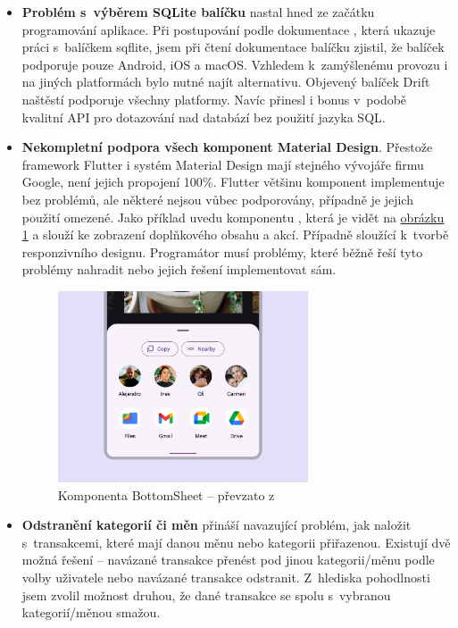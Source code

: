 \documentclass[
  biblatex,
  figures=true,
  tables=false,
  glossaries,
  index
]{kidiplom}
\begin{document}
\begin{itemize}
  \item \textbf{Problém s~výběrem SQLite balíčku} nastal hned ze začátku programování aplikace. Při postupování podle dokumentace \cite{flutter-docs}, která ukazuje práci s~balíčkem sqflite, jsem při čtení dokumentace balíčku zjistil, že balíček podporuje pouze Android, iOS a macOS. Vzhledem k~zamýšlenému provozu i na jiných platformách bylo nutné najít alternativu. Objevený balíček Drift naštěstí podporuje všechny platformy. Navíc přinesl i bonus v~podobě kvalitní API pro dotazování nad databází bez použití jazyka SQL.
  \item \textbf{Nekompletní podpora všech komponent Material Design}. Přestože framework Flutter i systém Material Design mají stejného vývojáře firmu Google, není jejich propojení 100\%. Flutter většinu komponent implementuje bez problémů, ale některé nejsou vůbec podporovány, případně je jejich použití omezené. Jako příklad uvedu komponentu , která je vidět na \hyperref[fig:bottomsheet]{obrázku \ref{fig:bottomsheet}} a slouží ke zobrazení doplňkového obsahu a akcí. Případně  sloužící k~tvorbě responzivního designu. Programátor musí problémy, které běžně řeší tyto problémy nahradit nebo jejich řešení implementovat sám.
  \begin{figure}
    \centering
    \includegraphics[width=0.7\textwidth]{images/bottom-sheet.png}
    \caption{Komponenta BottomSheet -- převzato z~\cite{m3}}
    \label{fig:bottomsheet}
  \end{figure}
  \item \textbf{Odstranění kategorií či měn} přináší navazující problém, jak naložit s~transakcemi, které mají danou měnu nebo kategorii přiřazenou. Existují dvě možná řešení -- navázané transakce přenést pod jinou kategorii/měnu podle volby uživatele nebo navázané transakce odstranit. Z~hlediska pohodlnosti jsem zvolil možnost druhou, že dané transakce se spolu s~vybranou kategorií/měnou smažou.
\end{itemize}
\end{document}
